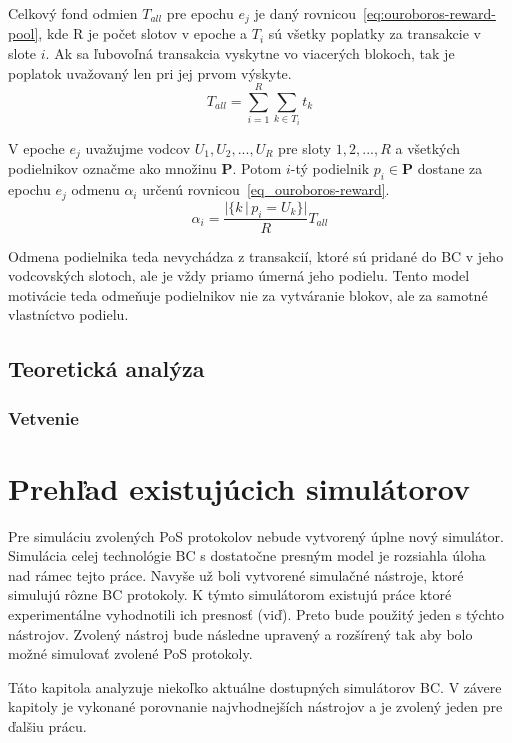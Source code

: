 Celkový fond odmien $T_{all}$ pre epochu $e_j$ je daný rovnicou~\ref{eq:ouroboros-reward-pool}, kde R je počet slotov v epoche a $T_i$ sú všetky poplatky za transakcie v slote $i$. Ak sa ľubovoľná transakcia vyskytne vo viacerých blokoch, tak je poplatok uvažovaný len pri jej prvom výskyte.
\begin{equation}\label{eq:ouroboros-reward-pool}
	T_{all} = \sum_{i=1}^{R}\sum_{k \in T_i}t_k
\end{equation}

V epoche $e_j$ uvažujme vodcov $U_1, U_2, ..., U_R$ pre sloty $1, 2, ..., R$ a všetkých podielnikov označme ako množinu $\mathbf{P}$. Potom $i$-tý podielnik $p_i \in \mathbf{P}$ dostane za epochu $e_j$ odmenu $\alpha_i$ určenú rovnicou~\ref{eq_ouroboros-reward}.
\begin{equation}\label{eq_ouroboros-reward}
	\alpha_i = \frac{|\{ k\,|\,p_i = U_k \}|}{R}T_{all}
\end{equation}

Odmena podielnika teda nevychádza z transakcií, ktoré sú pridané do BC v jeho vodcovských slotoch, ale je vždy priamo úmerná jeho podielu. Tento model motivácie teda odmeňuje podielnikov nie za vytváranie blokov, ale za samotné vlastníctvo podielu.

\section{Teoretická analýza}

\subsection{Vetvenie}

\chapter{Prehľad existujúcich simulátorov}

Pre simuláciu zvolených PoS protokolov nebude vytvorený úplne nový simulátor. Simulácia celej technológie BC s dostatočne presným model je rozsiahla úloha nad rámec tejto práce. Navyše už boli vytvorené simulačné nástroje, ktoré simulujú rôzne BC protokoly. K týmto simulátorom existujú práce ktoré experimentálne vyhodnotili ich presnosť (viď\cite{simulatorCompar, fanPerfEval}). Preto bude použitý jeden s týchto nástrojov. Zvolený nástroj bude následne upravený a rozšírený tak aby bolo možné simulovať zvolené PoS protokoly. 

Táto kapitola analyzuje niekoľko aktuálne dostupných simulátorov BC. V závere kapitoly je vykonané porovnanie najvhodnejších nástrojov a je zvolený jeden pre ďalšiu prácu.

